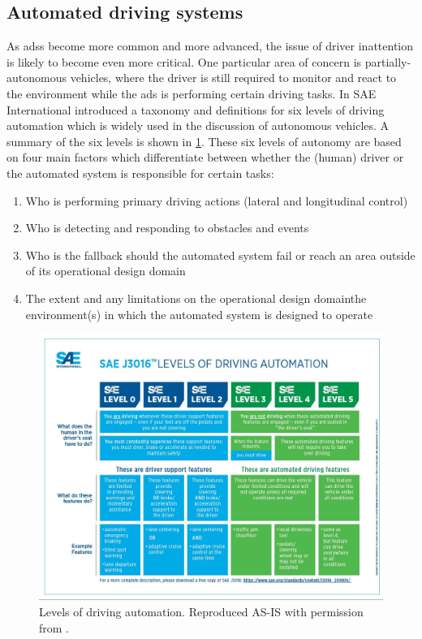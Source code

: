 \documentclass[11pt, parskip=half*,twoside=false]{scrbook}
\begin{document}
\subsection{Automated driving systems}
As \glspl{ads} become more common and more advanced, the issue of driver inattention is likely to become even more critical. One particular area of concern is partially-autonomous vehicles, where the driver is still required to monitor and react to the environment while the \gls{ads} is performing certain driving tasks.  In \citep{J3016_201806} SAE International introduced a taxonomy and definitions for six levels of driving automation which is widely used in the discussion of autonomous vehicles. A summary of the six levels is shown in \cref{fig:av_levels}. These six levels of autonomy are based on four main factors which differentiate between whether the (human) driver or the automated system is responsible for certain tasks: 

\begin{enumerate}
	\item Who is performing primary driving actions (lateral and longitudinal control) 
	\item Who is detecting and responding to obstacles and events
	\item Who is the fallback should the automated system fail or reach an area outside of its operational design domain
	\item The extent and any limitations on the operational design domain\textemdash the environment(s) in which the automated system is designed to operate
\end{enumerate}

\begin{figure}[h]
	\centering
	\includegraphics[width=\textwidth]{sae_av_levels} 
	\caption{Levels of driving automation. Reproduced AS-IS with permission from \citet{J3016_201806}.}
	\label{fig:av_levels}
\end{figure}
\end{document}
